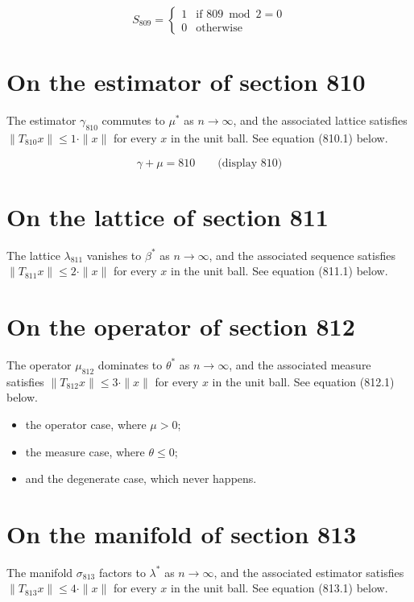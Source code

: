 \documentclass{article}
\begin{document}
\begin{equation}
S_{809} = \begin{cases} 1 & \text{if } 809 \bmod 2 = 0 \\ 0 & \text{otherwise} \end{cases}
\end{equation}

\section{On the estimator of section 810}
The estimator $\gamma_{810}$ commutes to $\mu^{*}$ as $n \to \infty$,
and the associated lattice satisfies $\|T_{810} x\| \leq 1 \cdot \|x\|$
for every $x$ in the unit ball. See equation (810.1) below.

$$
\gamma + \mu = 810 \qquad \text{(display 810)}
$$

\section{On the lattice of section 811}
The lattice $\lambda_{811}$ vanishes to $\beta^{*}$ as $n \to \infty$,
and the associated sequence satisfies $\|T_{811} x\| \leq 2 \cdot \|x\|$
for every $x$ in the unit ball. See equation (811.1) below.

\section{On the operator of section 812}
The operator $\mu_{812}$ dominates to $\theta^{*}$ as $n \to \infty$,
and the associated measure satisfies $\|T_{812} x\| \leq 3 \cdot \|x\|$
for every $x$ in the unit ball. See equation (812.1) below.

\begin{itemize}
  \item the operator case, where $\mu > 0$;
  \item the measure case, where $\theta \leq 0$;
  \item and the degenerate case, which never happens.
\end{itemize}

\section{On the manifold of section 813}
The manifold $\sigma_{813}$ factors to $\lambda^{*}$ as $n \to \infty$,
and the associated estimator satisfies $\|T_{813} x\| \leq 4 \cdot \|x\|$
for every $x$ in the unit ball. See equation (813.1) below.
\end{document}
